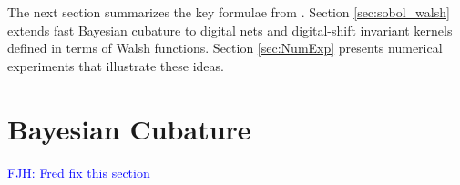 \documentclass[graybox,footinfo]{svmult}
\newcommand{\bm}[1]{\boldsymbol{#1}}
\newcommand{\vtheta}{{\bm{\theta}}}
\newcommand{\vb}{\bm{b}}
\newcommand{\vx}{\bm{x}}
\newcommand{\mV}{\mathsf{V}}
\newcommand{\FJHNote}[1]{{\textcolor{blue}{FJH: #1}}}
\begin{document}

The next section summarizes the key formulae from \cite{RatHic19a}.  Section \ref{sec:sobol_walsh} extends fast Bayesian cubature to digital nets and digital-shift invariant kernels defined in terms of Walsh functions.  Section \ref{sec:NumExp} presents numerical experiments that illustrate these ideas.  




\section{Bayesian Cubature}
\label{sec:BC} 


\FJHNote{Fred fix this section}
\end{document}
